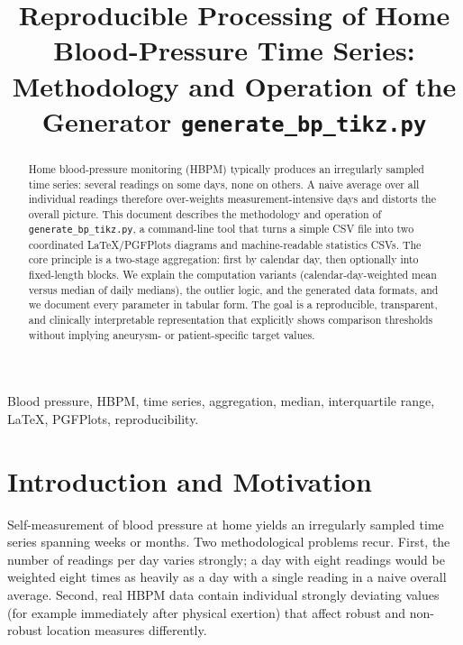 \documentclass[conference]{IEEEtran}
\begin{document}
\title{Reproducible Processing of Home Blood-Pressure Time Series:\\
Methodology and Operation of the Generator \texttt{generate\_bp\_tikz.py}}

\author{%
}

\maketitle

\begin{abstract}
Home blood-pressure monitoring (HBPM) typically produces an irregularly sampled
time series: several readings on some days, none on others. A naive average over
all individual readings therefore over-weights measurement-intensive days and
distorts the overall picture. This document describes the methodology and
operation of \texttt{generate\_bp\_tikz.py}, a command-line tool that turns a
simple CSV file into two coordinated LaTeX/PGFPlots diagrams and
machine-readable statistics CSVs. The core principle is a two-stage
aggregation: first by calendar day, then optionally into fixed-length blocks.
We explain the computation variants (calendar-day-weighted mean versus median of
daily medians), the outlier logic, and the generated data formats, and we
document every parameter in tabular form. The goal is a reproducible,
transparent, and clinically interpretable representation that explicitly shows
comparison thresholds without implying aneurysm- or patient-specific target
values.
\end{abstract}

\begin{IEEEkeywords}
Blood pressure, HBPM, time series, aggregation, median, interquartile range,
LaTeX, PGFPlots, reproducibility.
\end{IEEEkeywords}

\section{Introduction and Motivation}
Self-measurement of blood pressure at home yields an irregularly sampled time
series spanning weeks or months. Two methodological problems recur. First, the
number of readings per day varies strongly; a day with eight readings would be
weighted eight times as heavily as a day with a single reading in a naive
overall average. Second, real HBPM data contain individual strongly deviating
values (for example immediately after physical exertion) that affect robust and
non-robust location measures differently.
\end{document}
